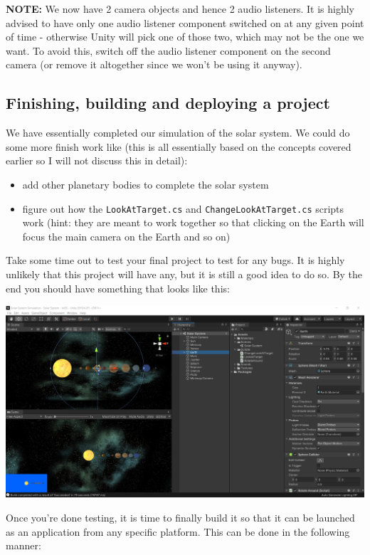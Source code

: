\documentclass{article}[a4paper,12pt]
\theoremstyle{definition}
\begin{document}
\textbf{NOTE:} We now have 2 camera objects and hence 2 audio listeners. It is highly advised to have only one audio listener component switched on at any given point of time - otherwise Unity will pick one of those two, which may not be the one we want. To avoid this, switch off the audio listener component on the second camera (or remove it altogether since we won't be using it anyway).

\subsection{Finishing, building and deploying a project}
We have essentially completed our simulation of the solar system. We could do some more finish work like (this is all essentially based on the concepts covered earlier so I will not discuss this in detail):
\begin{itemize}
	\item add other planetary bodies  to complete the solar system
	\item figure out how the \texttt{LookAtTarget.cs} and \texttt{ChangeLookAtTarget.cs} scripts work (hint: they are meant to work together so that clicking on the Earth will focus the main camera on the Earth and so on)
\end{itemize}
Take some time out to test your final project to test for any bugs. It is highly unlikely that this project will have any, but it is still a good idea to do so. By the end you should have something that looks like this:
\begin{center}\includegraphics[width=\textwidth]{solarsystem_final.png}\end{center}
Once you're done testing, it is time to finally build it so that it can be launched as an application from any specific platform. This can be done in the following manner:
\end{document}

